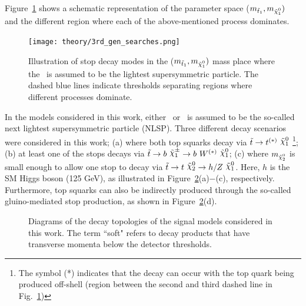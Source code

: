 				Figure~\ref{fig:stop_topologies} shows a schematic representation of the parameter space ($m_{\stopone}, m_{\ninoone})$ and the different region where each of the above-mentioned process dominates. %

				\begin{figure}[!htb]
					\centering
					\texttt{[image: theory/3rd\_gen\_searches.png]}
					\caption{\label{fig:stop_topologies} Illustration of stop decay modes in the ($m_{\stopone}, m_{\ninoone})$ mass place where the \ninoone\ is assumed to be the lightest supersymmetric particle. The dashed blue lines indicate thresholds separating regions where different processes dominate.}
				\end{figure}

				In the models considered in this work, either \ninotwo\ or \chinoonepm\ is assumed to be the so-called next lightest supersymmetric particle (NLSP). Three different decay scenarios were considered in this work; (a) where both top squarks decay via $\stop\rightarrow t^{(*)}\ \ninoone$ \footnote{The symbol (*) indicates that the decay can occur with the top quark being produced off-shell (region between the second and third dashed line in Fig.~\ref{fig:stop_topologies})}; (b) at least one of the stops decays via $\stop\rightarrow b\ \chinoonepm \rightarrow b\ \Wboson^{(*)}\ \ninoone$; (c) where $m_{\ninotwo}$ is small enough to allow one stop to decay via $\stop\to t\ \ninotwo \to h/Z\ \ninoone$. Here, $h$ is the SM Higgs boson (125 GeV), as illustrated in 
				Figure~\ref{fig:feynDiagModels}(a)$-$(c), respectively. Furthermore, top squarks can also be indirectly produced through the so-called gluino-mediated stop production, as shown in Figure~\ref{fig:feynDiagModels}(d). 				


				\begin{figure}[!htb]
					\begin{center}
						\hspace{0.05\textwidth}
						\hspace{0.05\textwidth}
						\hspace{0.05\textwidth}
						\hspace{0.05\textwidth}
					\end{center}
					\caption{Diagrams of the decay topologies of the signal models considered in this work. The term ``soft" refers to decay products that have transverse momenta below the detector thresholds.}
					\label{fig:feynDiagModels}
				\end{figure}

